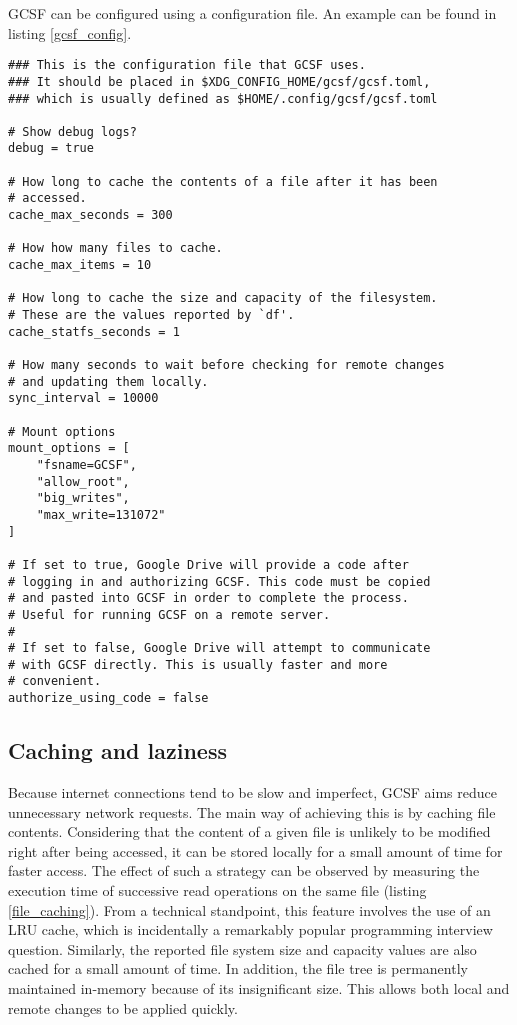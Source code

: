 GCSF can be configured using a configuration file. An example can be found in listing \ref{gcsf_config}. 

\begin{lstlisting}[basicstyle=\footnotesize\ttfamily,caption=GCSF configuration file, frame=single, label=gcsf_config,float]
### This is the configuration file that GCSF uses.
### It should be placed in $XDG_CONFIG_HOME/gcsf/gcsf.toml,
### which is usually defined as $HOME/.config/gcsf/gcsf.toml

# Show debug logs?
debug = true

# How long to cache the contents of a file after it has been
# accessed.
cache_max_seconds = 300

# How how many files to cache.
cache_max_items = 10

# How long to cache the size and capacity of the filesystem.
# These are the values reported by `df'.
cache_statfs_seconds = 1

# How many seconds to wait before checking for remote changes
# and updating them locally.
sync_interval = 10000

# Mount options
mount_options = [
    "fsname=GCSF",
    "allow_root",
    "big_writes",
    "max_write=131072"
]

# If set to true, Google Drive will provide a code after
# logging in and authorizing GCSF. This code must be copied
# and pasted into GCSF in order to complete the process.
# Useful for running GCSF on a remote server.
#
# If set to false, Google Drive will attempt to communicate
# with GCSF directly. This is usually faster and more
# convenient.
authorize_using_code = false
\end{lstlisting}


\subsection{Caching and laziness}

Because internet connections tend to be slow and imperfect, GCSF aims reduce unnecessary network requests. The main way of achieving this is by caching file contents. Considering that the content of a given file is unlikely to be modified right after being accessed, it can be stored locally for a small amount of time for faster access. The effect of such a strategy can be observed by measuring the execution time of successive read operations on the same file (listing \ref{file_caching}). From a technical standpoint, this feature involves the use of an LRU cache, which is incidentally a remarkably popular programming interview question. Similarly, the reported file system size and capacity values are also cached for a small amount of time. In addition, the file tree is permanently maintained in-memory because of its insignificant size. This allows both local and remote changes to be applied quickly.


